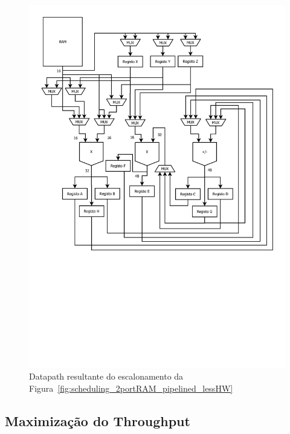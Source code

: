 \documentclass[a4paper]{article}
\begin{document}
\begin{figure}[H]
\centering
\centerline{\includegraphics[trim=0 750 0 80, clip, width=\paperwidth]{datapath_pipelined_lessHW}}
\caption{Datapath resultante do escalonamento da Figura~\ref{fig:scheduling_2portRAM_pipelined_lessHW}}
\label{fig:datapath_pipelined_lessHW}
\end{figure}

\pagebreak
\subsection{Maximização do Throughput}
\label{subsec:arqui_2portRAM_maxthroughput}

\end{document}
